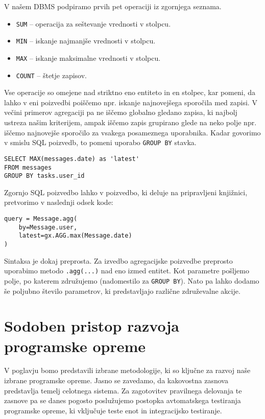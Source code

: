 \documentclass[a4paper,12pt,openright]{book}
\begin{document}
\begin{itemize}
        V našem DBMS podpiramo prvih pet operaciji iz zgornjega seznama.
        
        \begin{itemize}
            \item {\tt SUM} – operacija za seštevanje vrednosti v stolpcu.
            \item {\tt MIN} – iskanje najmanjše vrednosti v stolpcu.
            \item {\tt MAX} – iskanje maksimalne vrednosti v stolpcu.
            \item {\tt COUNT} – štetje zapisov.
        \end{itemize}

        Vse operacije so omejene nad striktno eno entiteto in en stolpec, kar pomeni, da lahko v eni poizvedbi poiščemo npr. iskanje najnovejšega sporočila med zapisi. V večini primerov agregaciji pa ne iščemo globalno gledano zapisa, ki najbolj ustreza našim kriterijem, ampak iščemo zapis grupirano glede na neko polje npr. iščemo najnovejše sporočilo za vsakega posameznega uporabnika. Kadar govorimo v smislu SQL poizvedb, to pomeni uporabo {\tt GROUP BY} stavka.

\begin{verbatim}
SELECT MAX(messages.date) as 'latest' 
FROM messages
GROUP BY tasks.user_id
\end{verbatim}

        \noindent
        Zgornjo SQL poizvedbo lahko v poizvedbo, ki deluje na pripravljeni knjižnici, pretvorimo v naslednji odsek kode:

\begin{verbatim}
query = Message.agg(
    by=Message.user, 
    latest=gx.AGG.max(Message.date)
)
\end{verbatim}

        \noindent
        Sintaksa je dokaj preprosta. Za izvedbo agregacijske poizvedbe preprosto uporabimo metodo {\tt .agg(...)} nad eno izmed entitet. Kot parametre pošljemo polje, po katerem združujemo (nadomestilo za {\tt GROUP BY}). Nato pa lahko dodamo še poljubno število parametrov, ki predstavljajo različne združevalne akcije.
\end{itemize}

\chapter{Sodoben pristop razvoja programske opreme}
\label{ch1}

    V poglavju bomo predstavili izbrane metodologije, ki so ključne za razvoj naše izbrane programske opreme. Jasno se zavedamo, da kakovostna zasnova predstavlja temelj celotnega sistema. Za zagotovitev pravilnega delovanja te zasnove pa se danes pogosto poslužujemo postopka avtomatskega testiranja programske opreme, ki vključuje teste enot in integracijsko testiranje.
\end{document}
